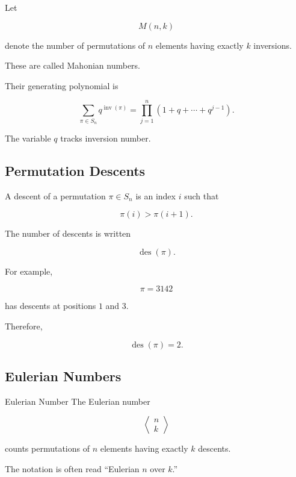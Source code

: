 Let

\[
M(n,k)
\]

denote the number of permutations of \(n\) elements having exactly
\(k\) inversions.

These are called Mahonian numbers.

Their generating polynomial is

\[
\boxed{
\sum_{\pi\in S_n}
q^{\operatorname{inv}(\pi)}
=
\prod_{j=1}^{n}
(1+q+\cdots+q^{j-1}).
}
\]

The variable \(q\) tracks inversion number.

\subsection{Permutation Descents}
\label{subsec:permutation-descents}

A descent of a permutation \(\pi\in S_n\) is an index \(i\) such that

\[
\pi(i)>\pi(i+1).
\]

The number of descents is written

\[
\operatorname{des}(\pi).
\]

For example,

\[
\pi=3142
\]

has descents at positions \(1\) and \(3\).

Therefore,

\[
\operatorname{des}(\pi)=2.
\]

\subsection{Eulerian Numbers}
\label{subsec:eulerian-numbers}

\begin{definitionbox}{Eulerian Number}
The Eulerian number

\[
\boxed{
\left\langle
\begin{matrix}
n\\
k
\end{matrix}
\right\rangle
}
\]

counts permutations of \(n\) elements having exactly \(k\) descents.
\end{definitionbox}

The notation is often read ``Eulerian \(n\) over \(k\).''


